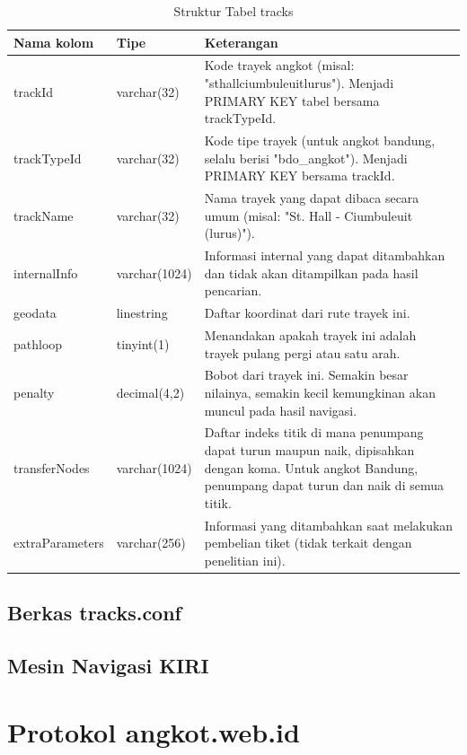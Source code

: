 \begin{table}
	\begin{tabular}{|p{2.5cm}|p{2.5cm}|p{10cm}|}
		\hline
		Nama kolom & Tipe & Keterangan \\
		\hline
		trackId & varchar(32) & Kode trayek angkot (misal: "sthallciumbuleuitlurus").
			Menjadi PRIMARY KEY tabel bersama trackTypeId. \\
		trackTypeId & varchar(32) & Kode tipe trayek (untuk angkot bandung,
			selalu berisi "bdo\_angkot"). Menjadi PRIMARY KEY bersama trackId. \\
		trackName & varchar(32) & Nama trayek yang dapat dibaca secara umum
			(misal: "St. Hall - Ciumbuleuit (lurus)"). \\
		internalInfo & varchar(1024) & Informasi internal yang dapat
			ditambahkan dan tidak akan ditampilkan pada hasil pencarian. \\
		geodata & linestring & Daftar koordinat dari rute trayek ini. \\
		pathloop & tinyint(1) & Menandakan apakah trayek ini adalah trayek
			pulang pergi atau satu arah. \\
		penalty & decimal(4,2) & Bobot dari trayek ini. Semakin besar nilainya,
			semakin kecil kemungkinan akan muncul pada hasil navigasi. \\
		transferNodes & varchar(1024) & Daftar indeks titik di mana penumpang
			dapat turun maupun naik, dipisahkan dengan koma. Untuk angkot
			Bandung, penumpang dapat turun dan naik di semua titik. \\
		extraParameters & varchar(256) & Informasi yang ditambahkan saat
		melakukan pembelian tiket (tidak terkait dengan penelitian ini). \\
		\hline
	\end{tabular}
	\caption{Struktur Tabel tracks}
	\label{tab:2_struktur_tabel_tracks}
\end{table}

\subsection{Berkas tracks.conf}

\subsection{Mesin Navigasi KIRI}

\section{Protokol angkot.web.id}
\label{sec:mesin_navigasi_kiri}

